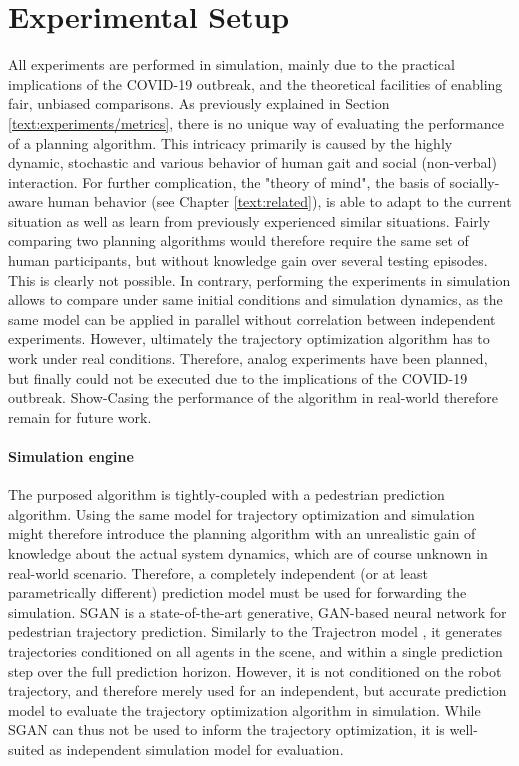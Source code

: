 \section{Experimental Setup}
\label{text:experiments/setup}
All experiments are performed in simulation, mainly due to the practical implications of the COVID-19 outbreak, and the theoretical facilities of enabling fair, unbiased comparisons. As previously explained in Section \ref{text:experiments/metrics}, there is no unique way of evaluating the performance of a planning algorithm. This intricacy primarily is caused by the highly dynamic, stochastic and various behavior of human gait and social (non-verbal) interaction. For further complication, the "theory of mind", the basis of socially-aware human behavior (see Chapter \ref{text:related}), is able to adapt to the current situation as well as learn from previously experienced similar situations. Fairly comparing two planning algorithms would therefore require the same set of human participants, but without knowledge gain over several testing episodes. This is clearly not possible. In contrary, performing the experiments in simulation allows to compare under same initial conditions and simulation dynamics, as the same model can be applied in parallel without correlation between independent experiments. 
\newline
However, ultimately the trajectory optimization algorithm has to work under real conditions. Therefore, analog experiments have been planned, but finally could not be executed due to the implications of the COVID-19 outbreak. Show-Casing the performance of the algorithm in real-world therefore remain for future work.

\paragraph{Simulation engine}
The purposed algorithm is tightly-coupled with a pedestrian prediction algorithm. Using the same model for trajectory optimization and simulation might therefore introduce the planning algorithm with an unrealistic gain of knowledge about the actual system dynamics, which are of course unknown in real-world scenario. Therefore, a completely independent (or at least parametrically different) prediction model must be used for forwarding the simulation. \ac{SGAN} \cite{Gupta2018} is a state-of-the-art generative, \ac{GAN}-based neural network for pedestrian trajectory prediction. Similarly to the Trajectron model \cite{Salzmann2020}, it generates trajectories conditioned on all agents in the scene, and within a single prediction step over the full prediction horizon. However, it is not conditioned on the robot trajectory, and therefore merely used for an independent, but accurate prediction model to evaluate the trajectory optimization algorithm in simulation. While \ac{SGAN} can thus not be used to inform the trajectory optimization, it is well-suited as independent simulation model for evaluation. 

